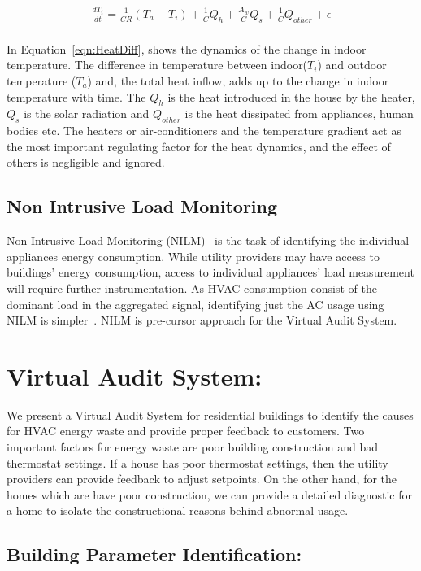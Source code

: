 \documentclass{sig-alternate}
\begin{document}
 \begin{eqnarray}\label{eqn:HeatDiff}
 \frac{dT_i}{dt} = \frac{1}{C  R} (T_a-T_i) + \frac{1}{C}Q_{h} + \frac{A_w}{C}Q_s + \frac{1}{C}Q_{other} + \epsilon \nonumber \\
 \end{eqnarray}  

  In Equation~\ref{eqn:HeatDiff}, shows the dynamics of the change in indoor temperature. The difference in temperature between indoor($T_i$) and outdoor temperature ($T_a$) and, the total heat inflow, adds up to the change in indoor temperature with time. The $Q_h$ is the heat introduced in the house by the heater, $Q_s$ is the solar radiation and $Q_{other}$ is the heat dissipated from appliances, human bodies etc. The heaters or air-conditioners and the temperature gradient act as the most important regulating factor for the heat dynamics, and the effect of others is negligible and ignored. 
 
 \subsection{Non Intrusive Load Monitoring} 
 
 Non-Intrusive Load Monitoring (NILM)~\cite{NILM} is the task of identifying the individual appliances energy consumption. While utility providers may have access to buildings' energy consumption, access to individual appliances' load measurement will require further instrumentation. As HVAC consumption consist of the dominant load in the aggregated signal, identifying just the AC usage using NILM is simpler~\cite{NILMAC}. NILM is pre-cursor approach for the Virtual Audit System.  

\section{Virtual Audit System:}

\indent We present a Virtual Audit System for residential buildings to identify the causes for HVAC energy waste and provide proper feedback to customers. Two important factors for energy waste are poor building construction and bad thermostat settings. If a house has poor thermostat settings, then the utility providers can provide feedback to adjust setpoints. On the other hand, for the homes which are have poor construction, we can provide a detailed diagnostic for a home to isolate the constructional reasons behind abnormal usage.

\subsection{Building Parameter Identification:} 
\end{document}
